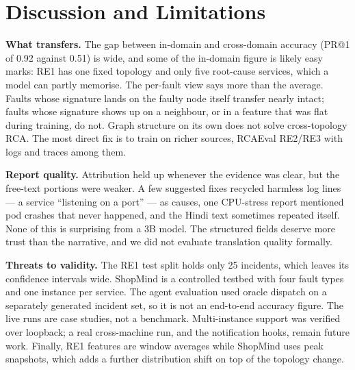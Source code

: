\documentclass[conference,a4paper]{IEEEtran}
\begin{document}
\section{Discussion and Limitations}
\textbf{What transfers.} The gap between in-domain and cross-domain accuracy (PR@1 of 0.92 against 0.51) is wide, and some of the in-domain figure is likely easy marks: RE1 has one fixed topology and only five root-cause services, which a model can partly memorise. The per-fault view says more than the average. Faults whose signature lands on the faulty node itself transfer nearly intact; faults whose signature shows up on a neighbour, or in a feature that was flat during training, do not. Graph structure on its own does not solve cross-topology RCA. The most direct fix is to train on richer sources, RCAEval RE2/RE3 with logs and traces among them.

\textbf{Report quality.} Attribution held up whenever the evidence was clear, but the free-text portions were weaker. A few suggested fixes recycled harmless log lines --- a service ``listening on a port'' --- as causes, one CPU-stress report mentioned pod crashes that never happened, and the Hindi text sometimes repeated itself. None of this is surprising from a 3B model. The structured fields deserve more trust than the narrative, and we did not evaluate translation quality formally.

\textbf{Threats to validity.} The RE1 test split holds only 25 incidents, which leaves its confidence intervals wide. ShopMind is a controlled testbed with four fault types and one instance per service. The agent evaluation used oracle dispatch on a separately generated incident set, so it is not an end-to-end accuracy figure. The live runs are case studies, not a benchmark. Multi-instance support was verified over loopback; a real cross-machine run, and the notification hooks, remain future work. Finally, RE1 features are window averages while ShopMind uses peak snapshots, which adds a further distribution shift on top of the topology change.

\end{document}
